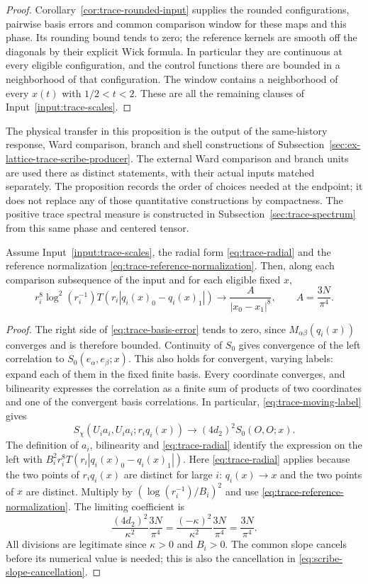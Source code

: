 \begin{proof}
Corollary~\ref{cor:trace-rounded-input} supplies the rounded
configurations, pairwise basis errors and common comparison window
for these maps and this phase. Its rounding bound tends to zero;
the reference kernels are smooth off the diagonals by their explicit
Wick formula. In particular they are continuous at every eligible
configuration, and the control functions there are bounded in a
neighborhood of that configuration. The window contains a
neighborhood of every $x(t)$ with $1/2<t<2$. These are all the
remaining clauses of Input~\ref{input:trace-scales}.
\end{proof}
The physical transfer in this proposition is the output of the
same-history response, Ward comparison, branch and shell constructions of
Subsection~\ref{sec:ex-lattice-trace-scribe-producer}. The external
Ward comparison and branch units are used there as distinct statements, with
their actual inputs matched separately. The proposition records the
order of choices needed at the endpoint; it does not replace any of
those quantitative constructions by compactness. The positive trace
spectral measure is constructed in Subsection~\ref{sec:trace-spectrum}
from this same phase and centered tensor.

\begin{lemma}\label{lem:trace-moving-correlation}
Assume Input~\ref{input:trace-scales}, the radial form
\eqref{eq:trace-radial} and the reference normalization
\eqref{eq:trace-reference-normalization}. Then, along each comparison
subsequence of the input and for each eligible fixed $x$,
\[
 r_i^8\log^2(r_i^{-1})T(r_i|q_i(x)_0-q_i(x)_1|)
       \longrightarrow \frac{A}{|x_0-x_1|^8},
 \qquad A=\frac{3N}{\pi^4}.
\]
\end{lemma}
\begin{proof}
The right side of \eqref{eq:trace-basis-error} tends to zero, since
$M_{\alpha\beta}(q_i(x))$ converges and is therefore bounded.
Continuity of $S_0$ gives convergence of the left correlation to
$S_0(e_\alpha,e_\beta;x)$. This also holds for convergent, varying labels:
expand each of them in the fixed finite basis. Every coordinate converges,
and bilinearity expresses the correlation as a finite sum of products of
two coordinates and one of the convergent basis correlations. In particular,
\eqref{eq:trace-moving-label} gives
\[
 S_\chi(U_ia_i,U_ia_i;r_iq_i(x))
 \longrightarrow (4d_2)^2 S_0(O,O;x).
\]
The definition of $a_i$, bilinearity and \eqref{eq:trace-radial} identify
the expression on the left with
$B_i^2r_i^8T(r_i|q_i(x)_0-q_i(x)_1|)$.
Here \eqref{eq:trace-radial} applies because the two points of
$r_iq_i(x)$ are distinct for large $i$: $q_i(x)\to x$ and the two points
of $x$ are distinct.
Multiply by $(\log(r_i^{-1})/B_i)^2$ and use
\eqref{eq:trace-reference-normalization}. The limiting coefficient is
\[
 \frac{(4d_2)^2}{\kappa^2}\frac{3N}{\pi^4}
       =\frac{(-\kappa)^2}{\kappa^2}\frac{3N}{\pi^4}
       =\frac{3N}{\pi^4}.
\]
All divisions are legitimate since $\kappa>0$ and $B_i>0$.
The common slope cancels before its numerical value is needed; this is
also the cancellation in \eqref{eq:scribe-slope-cancellation}.
\end{proof}

